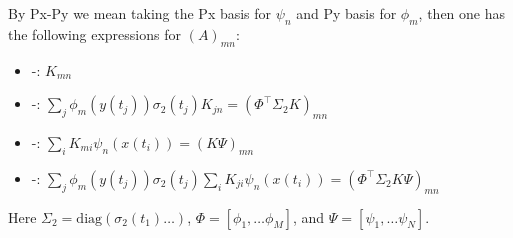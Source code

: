 \documentclass{article}
\begin{document}
By Px-Py we mean taking the Px basis for $\psi_n$ and Py basis for
$\phi_m$, then one has the following expressions for $(A)_{mn}$: 
\begin{itemize} 
\item \Pz-\Pz: $K_{mn}$ 
\item \Pz-\Po: $\sum_j \phi_m(y(t_j)) \sigma_2(t_j) K_{jn} =(\Phi^\top\Sigma_2 K)_{mn}$
\item \Po-\Pz: $\sum_i K_{mi}\psi_n(x(t_i)) = (K\Psi)_{mn}$ 
\item \Po-\Po: $\sum_j\phi_m(y(t_j))\sigma_2(t_j)\sum_i K_{ji} \psi_n(x(t_i)) = (\Phi^\top\Sigma_2 K\Psi)_{mn}$
\end{itemize} 
Here $\Sigma_2=\mbox{diag}(\sigma_2(t_1)\ldots)$, $\Phi=[\phi_1, \ldots \phi_M]$, and $\Psi=[\psi_1,\ldots \psi_N]$.
\end{document}
